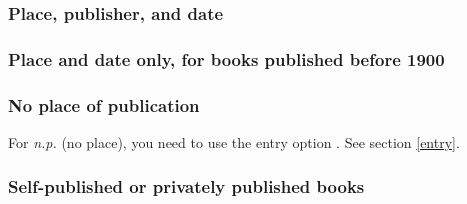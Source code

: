 \documentclass[11pt,letterpaper,oneside]{article}
\begin{document}
\begin{citebib}
\item \cite{boxer1953}
\item \cite{palmatary1950}
\end{citebib}

\subsubsection{Place, publisher, and date}

\begin{citebib}
\item \cite{woolf1927}
\end{citebib}

\subsubsection{Place and date only, for books published before 1900}

\begin{citebib}
\item \cite{goldsmith1766}
\item \cite{cervantes1605}
\end{citebib}

\setcounter{subsubsection}{131}
\subsubsection{No place of publication}
\label{14.132}

For \textit{n.p.} (no place), you need to use the entry option
. See section \ref{entry}.

\begin{citeonly}
\item[] \cite{windsor1910}
\item[] \cite{vliet1890}
\end{citeonly}

\setcounter{subsubsection}{136}
\subsubsection{Self-published or privately published books}
\end{document}
